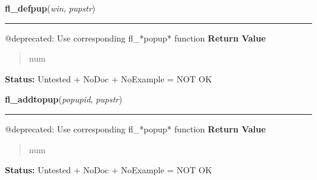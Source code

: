     \label{xformslib:deprecated:fl_defpup}

    \vspace{0.5ex}

\hspace{.8\funcindent}\begin{boxedminipage}{\funcwidth}

    \raggedright \textbf{fl\_defpup}(\textit{win}, \textit{pupstr})

    \vspace{-1.5ex}

    \rule{\textwidth}{0.5\fboxrule}
\setlength{\parskip}{2ex}

@deprecated: Use corresponding fl\_*popup* function
\setlength{\parskip}{1ex}
      \textbf{Return Value}
    \vspace{-1ex}

      \begin{quote}

num
      \end{quote}

\textbf{Status:} 
Untested + NoDoc + NoExample = NOT OK


    \end{boxedminipage}

    \label{xformslib:deprecated:fl_addtopup}

    \vspace{0.5ex}

\hspace{.8\funcindent}\begin{boxedminipage}{\funcwidth}

    \raggedright \textbf{fl\_addtopup}(\textit{popupid}, \textit{pupstr})

    \vspace{-1.5ex}

    \rule{\textwidth}{0.5\fboxrule}
\setlength{\parskip}{2ex}

@deprecated: Use corresponding fl\_*popup* function
\setlength{\parskip}{1ex}
      \textbf{Return Value}
    \vspace{-1ex}

      \begin{quote}

num
      \end{quote}

\textbf{Status:} 
Untested + NoDoc + NoExample = NOT OK


    \end{boxedminipage}

